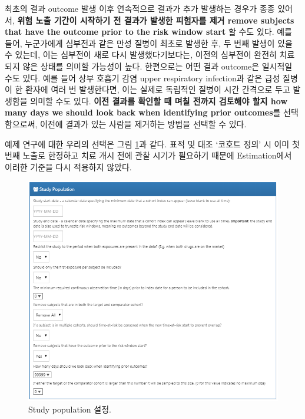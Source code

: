 \documentclass[10.5pt]{book}
\theoremstyle{definition}
\theoremstyle{definition}
\theoremstyle{definition}
\theoremstyle{remark}
\begin{document}
최초의 결과 outcome 발생 이후 연속적으로 결과가 추가 발생하는 경우가
종종 있어서, \textbf{위험 노출 기간이 시작하기 전 결과가 발생한 피험자를
제거 remove subjects that have the outcome prior to the risk window
start} 할 수도 있다. 예를 들어, 누군가에게 심부전과 같은 만성 질병이
최초로 발생한 후, 두 번째 발생이 있을 수 있는데, 이는 심부전이 새로 다시
발생했다기보다는, 이전의 심부전이 완전히 치료되지 않은 상태를 의미할
가능성이 높다. 한편으로는 어떤 결과 outcome은 일시적일 수도 있다. 예를
들어 상부 호흡기 감염 upper respiratory infection과 같은 급성 질병이 한
환자에 여러 번 발생한다면, 이는 실제로 독립적인 질병이 시간 간격으로
두고 발생함을 의미할 수도 있다. \textbf{이전 결과를 확인할 때 며칠
전까지 검토해야 할지 how many days we should look back when identifying
prior outcomes}를 선택함으로써, 이전에 결과가 있는 사람을 제거하는
방법을 선택할 수 있다.

예제 연구에 대한 우리의 선택은 그림 \ref{fig:studyPopulation}과 같다.
표적 및 대조 `코호트 정의' 시 이미 첫 번째 노출로 한정하고 치료 개시
전에 관찰 시기가 필요하기 때문에 Estimation에서 이러한 기준을 다시
적용하지 않았다.

\begin{figure}

{\centering \includegraphics[width=1\linewidth]{images/PopulationLevelEstimation/studyPopulation} 

}

\caption{Study population 설정.}\label{fig:studyPopulation}
\end{figure}
\end{document}

